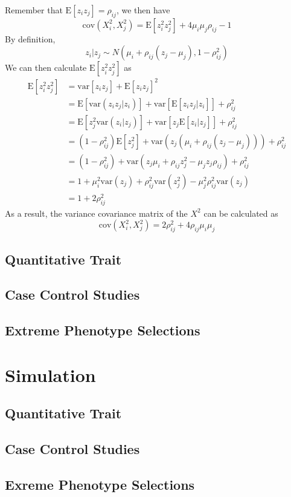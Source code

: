 \documentclass{book}
\begin{document}
		Remember that $\mathrm{E}[z_iz_j] = \rho_{ij}$, we then have
		$$
		\mathrm{cov}(X_i^2, X_j^2)=\mathrm{E}[z_i^2z_j^2]+4\mu_i\mu_j\rho_{ij}-1
		$$
		By definition, 
		$$
		z_i|z_j\sim N(\mu_i+\rho_{ij}(z_j-\mu_j),1-\rho_{ij}^2)
		$$
		We can then calculate $\mathrm{E}[z_i^2z_j^2]$ as
		\begin{align*}
		\mathrm{E}[z_i^2z_j^2]&=\mathrm{var}[z_iz_j]+\mathrm{E}[z_iz_j]^2\\
		&=\mathrm{E}[\mathrm{var}(z_iz_j|z_i)]+\mathrm{var}[\mathrm{E}[z_iz_j|z_i]]+\rho_{ij}^2\\
		&=\mathrm{E}[z_j^2\mathrm{var}(z_i|z_j)]+\mathrm{var}[z_j\mathrm{E}[z_i|z_j]]+\rho_{ij}^2\\
		&=(1-\rho_{ij}^2)\mathrm{E}[z_j^2]+\mathrm{var}(z_j(\mu_i+\rho_{ij}(z_j-\mu_j)))+\rho_{ij}^2\\
		&=(1-\rho_{ij}^2)+\mathrm{var}(z_j\mu_i+\rho_{ij}z_j^2-\mu_jz_j\rho_{ij})+\rho_{ij}^2\\
		&=1+\mu_i^2\mathrm{var}(z_j)+\rho_{ij}^2\mathrm{var}(z_j^2)-\mu_j^2\rho_{ij}^2\mathrm{var}(z_j)\\
		&=1+2\rho_{ij}^2
		\end{align*}
		As a result, the variance covariance matrix of the $X^2$ can be calculated as
		$$
		\mathrm{cov}(X_i^2,X_j^2) = 2\rho_{ij}^2+4\rho_{ij}\mu_i\mu_j
		$$
			
	\subsection{Quantitative Trait}
	\subsection{Case Control Studies}
	\subsection{Extreme Phenotype Selections}
	\section{Simulation}
	\subsection{Quantitative Trait}
	\subsection{Case Control Studies}
	\subsection{Exreme Phenotype Selections}
\end{document}
